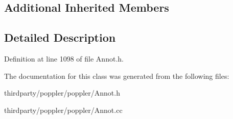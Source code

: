 \subsection*{Additional Inherited Members}


\subsection{Detailed Description}


Definition at line 1098 of file Annot.\+h.



The documentation for this class was generated from the following files\+:\begin{DoxyCompactItemize}
\item 
thirdparty/poppler/poppler/Annot.\+h\item 
thirdparty/poppler/poppler/Annot.\+cc\end{DoxyCompactItemize}
